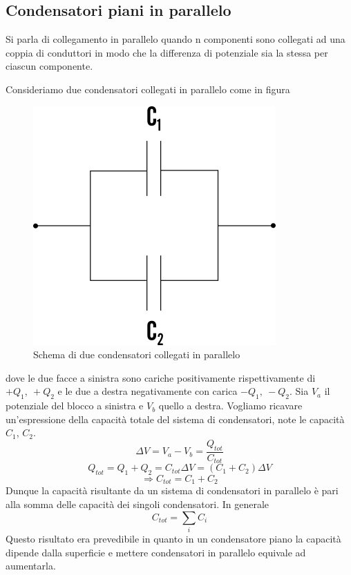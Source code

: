 \documentclass[
10pt, %
a4paper, %
oneside, %
headinclude,footinclude, %
BCOR5mm, %
]{scrartcl}
\begin{document}
\subsection*{Condensatori piani in parallelo}
\begin{definizione}
Si parla di collegamento in parallelo quando n componenti sono collegati ad una coppia di conduttori in modo che la differenza di potenziale sia la stessa per ciascun componente.
\end{definizione}
Consideriamo due condensatori collegati in parallelo come in figura
\begin{figure}[h!]
	\centering
	\includegraphics[width=0.4\linewidth]{images/Condensatori_parallelo}
	\caption{Schema di due condensatori collegati in parallelo}
	\label{fig:condensatoriparallelo}
\end{figure}
\FloatBarrier
dove le due facce a sinistra sono cariche positivamente rispettivamente di \(+Q_1,\ +Q_2\) e le due a destra negativamente con carica \(-Q_1,\ -Q_2\). Sia \(V_a\) il potenziale del blocco a sinistra e \(V_b\) quello a destra. Vogliamo ricavare un'espressione della capacità totale del sistema di condensatori, note le capacità \(C_1\), \(C_2\). 
\[\Delta V = V_a - V_b = \frac{Q_{tot}}{C_{tot}}\] 
\[Q_{tot}=Q_1+Q_2=C_{tot}\Delta V = (C_1+C_2)\Delta V\]
\[\Rightarrow C_{tot} = C_1 +C_2\]
Dunque la capacità risultante da un sistema di condensatori in parallelo è pari alla somma delle capacità dei singoli condensatori. In generale
\[C_{tot} = \sum_i C_i\]
Questo risultato era prevedibile in quanto in un condensatore piano la capacità dipende dalla superficie e mettere condensatori in parallelo equivale ad aumentarla. 
\end{document}

